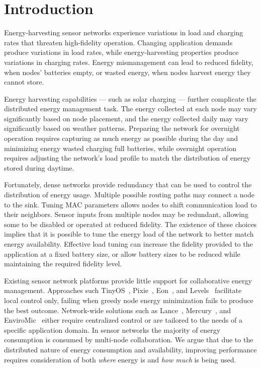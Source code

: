 \section{Introduction}
\label{sec-introduction}

Energy-harvesting sensor networks experience variations in load and charging
rates that threaten high-fidelity operation. Changing application demands
produce variations in load rates, while energy-harvesting properties
produce variations in charging rates. Energy mismanagement can lead to
reduced fidelity, when nodes' batteries empty, or wasted energy, when nodes
harvest energy they cannot store.

Energy harvesting capabilities --- such as solar charging --- further
complicate the distributed energy management task. The energy collected at
each node may vary significantly based on node placement, and the energy
collected daily may vary significantly based on weather patterns.  Preparing
the network for overnight operation requires capturing as much energy as
possible during the day and minimizing energy wasted charging full batteries,
while overnight operation requires adjusting the network's load profile to
match the distribution of energy stored during daytime.

Fortunately, dense networks provide redundancy that can be used to control
the distribution of energy usage. Multiple possible routing paths may connect
a node to the sink. Tuning MAC parameters allows nodes to shift communication
load to their neighbors. Sensor inputs from multiple nodes may be redundant,
allowing some to be disabled or operated at reduced fidelity.  The existence
of these choices implies that it is possible to tune the energy load of the
network to better match energy availability. Effective load tuning can
increase the fidelity provided to the application at a fixed battery size, or
allow battery sizes to be reduced while maintaining the required fidelity
level.
\vfill\eject

Existing sensor network platforms provide little support for collaborative
energy management. Approaches such TinyOS~\cite{tinyos-asplos00},
Pixie~\cite{pixie-sensys08}, Eon~\cite{eon-sensys07}, and
Levels~\cite{levels-sensys07} facilitate local control only, failing when
greedy node energy minimization fails to produce the best outcome.
Network-wide solutions such as Lance~\cite{lance-sensys08},
Mercury~\cite{parkinsons-embs07}, and EnviroMic~\cite{enviromic} either
require centralized control or are tailored to the needs of a specific
application domain. In sensor networks the majority of energy consumption is
consumed by multi-node collaboration. We argue that due to the distributed
nature of energy consumption and availability, improving performance requires
consideration of both \textit{where} energy is and \textit{how much} is being
used.

